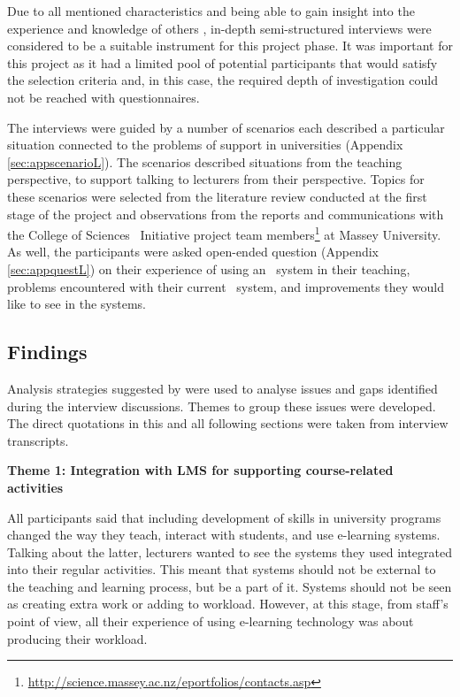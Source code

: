 Due to all mentioned characteristics and being able to gain insight into the
experience and knowledge of others \citep{Schostak2006}, in-depth
semi-structured interviews were considered to be a suitable instrument for this
project phase. It was important for this project as it had a limited pool of 
potential participants that would satisfy the selection criteria and, in this
case, the required depth of investigation could not be reached with
questionnaires.

The interviews were guided by a number of scenarios each described a particular
situation connected to the problems of \LLLs support in universities (Appendix
\ref{sec:appscenarioL}). The scenarios described situations from the teaching
perspective, to support talking to lecturers from their perspective. Topics for
these scenarios were selected from the literature review conducted at the first
stage of the project and observations from the reports and communications with
the College of Sciences \ep~Initiative project team
members\footnote{\url{http://science.massey.ac.nz/eportfolios/contacts.asp}} at
Massey University. As well, the participants were asked open-ended question
(Appendix \ref{sec:appquestL}) on their experience of using an \ep~system in
their teaching, problems encountered with their current \ep~system, and
improvements they would like to see in the systems.

\subsection{Findings}

Analysis strategies suggested by \citet{Marshall2010} were used to analyse
issues and gaps identified during the interview discussions. Themes to group
these issues were developed. The direct quotations in this and all following
sections were taken from interview transcripts.

\textbf{Theme 1: Integration with LMS for supporting course-related activities}

All participants said that including development of \LLLs skills in university
programs changed the way they teach, interact with students, and use e-learning
systems. Talking about the latter, lecturers wanted to see the systems they used
integrated into their regular activities. This meant that systems should not be
external to the teaching and learning process, but be a part of it. Systems
should not be seen as creating extra work or adding to workload. However, at
this stage, from staff's point of view, all their experience of using e-learning
technology was about producing their workload.

